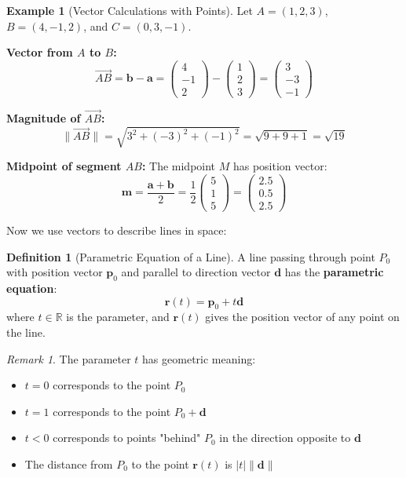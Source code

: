\documentclass[12pt]{article}
\numberwithin{equation}{section}
\newcommand{\vect}[1]{\boldsymbol{#1}}   %
\theoremstyle{plain}
\theoremstyle{definition}
\newtheorem{definition}[theorem]{Definition}
\newtheorem{example}[theorem]{Example}
\theoremstyle{remark}
\newtheorem{remark}[theorem]{Remark}
\begin{document}
\begin{example}[Vector Calculations with Points]
Let $A = (1, 2, 3)$, $B = (4, -1, 2)$, and $C = (0, 3, -1)$.

\textbf{Vector from $A$ to $B$:}
$$\overrightarrow{AB} = \vect{b} - \vect{a} = \begin{pmatrix} 4 \\ -1 \\ 2 \end{pmatrix} - \begin{pmatrix} 1 \\ 2 \\ 3 \end{pmatrix} = \begin{pmatrix} 3 \\ -3 \\ -1 \end{pmatrix}$$

\textbf{Magnitude of $\overrightarrow{AB}$:}
$$\|\overrightarrow{AB}\| = \sqrt{3^2 + (-3)^2 + (-1)^2} = \sqrt{9 + 9 + 1} = \sqrt{19}$$

\textbf{Midpoint of segment $AB$:}
The midpoint $M$ has position vector:
$$\vect{m} = \frac{\vect{a} + \vect{b}}{2} = \frac{1}{2}\begin{pmatrix} 5 \\ 1 \\ 5 \end{pmatrix} = \begin{pmatrix} 2.5 \\ 0.5 \\ 2.5 \end{pmatrix}$$
\end{example}

Now we use vectors to describe lines in space:

\begin{definition}[Parametric Equation of a Line]
A line passing through point $P_0$ with position vector $\vect{p}_0$ and parallel to direction vector $\vect{d}$ has the \textbf{parametric equation}:
$$\vect{r}(t) = \vect{p}_0 + t\vect{d}$$
where $t \in \mathbb{R}$ is the parameter, and $\vect{r}(t)$ gives the position vector of any point on the line.
\end{definition}

\begin{remark}
The parameter $t$ has geometric meaning:
\begin{itemize}
\item $t = 0$ corresponds to the point $P_0$
\item $t = 1$ corresponds to the point $P_0 + \vect{d}$
\item $t < 0$ corresponds to points "behind" $P_0$ in the direction opposite to $\vect{d}$
\item The distance from $P_0$ to the point $\vect{r}(t)$ is $|t|\|\vect{d}\|$
\end{itemize}
\end{remark}
\end{document}

